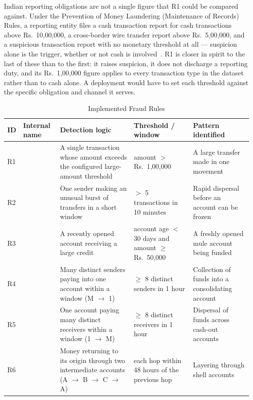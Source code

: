 Indian reporting obligations are not a single figure that R1 could be compared against. Under the Prevention of Money Laundering (Maintenance of Records) Rules, a reporting entity files a cash transaction report for cash transactions above Rs.~10,00,000, a cross-border wire transfer report above Rs.~5,00,000, and a suspicious transaction report with no monetary threshold at all --- suspicion alone is the trigger, whether or not cash is involved~\cite{fiuindia}. R1 is closer in spirit to the last of these than to the first: it raises suspicion, it does not discharge a reporting duty, and its Rs.~1,00,000 figure applies to every transaction type in the dataset rather than to cash alone. A deployment would have to set each threshold against the specific obligation and channel it serves.

\begin{table}[H]
\centering
\caption{Implemented Fraud Rules}
\label{tab:rules}
\footnotesize
\begin{tabularx}{\textwidth}{@{}L{0.55cm}L{2.75cm}L{3.45cm}L{2.7cm}Y@{}}
\toprule
\textbf{ID} & \textbf{Internal name} & \textbf{Detection logic} & \textbf{Threshold / window} & \textbf{Pattern identified} \\
\midrule
R1 &  & A single transaction whose amount exceeds the configured large-amount threshold & amount $>$ Rs.~1,00,000 & A large transfer made in one movement \\
R2 &  & One sender making an unusual burst of transfers in a short window & $>$ 5 transactions in 10 minutes & Rapid dispersal before an account can be frozen \\
R3 &  & A recently opened account receiving a large credit & account age $<$ 30 days and amount $\geq$ Rs.~50,000 & A freshly opened mule account being funded \\
R4 &  & Many distinct senders paying into one account within a window (M $\rightarrow$ 1) & $\geq$ 8 distinct senders in 1 hour & Collection of funds into a consolidating account \\
R5 &  & One account paying many distinct receivers within a window (1 $\rightarrow$ M) & $\geq$ 8 distinct receivers in 1 hour & Dispersal of funds across cash-out accounts \\
R6 &  & Money returning to its origin through two intermediate accounts (A $\rightarrow$ B $\rightarrow$ C $\rightarrow$ A) & each hop within 48 hours of the previous hop & Layering through shell accounts \\
\bottomrule
\end{tabularx}
\end{table}

